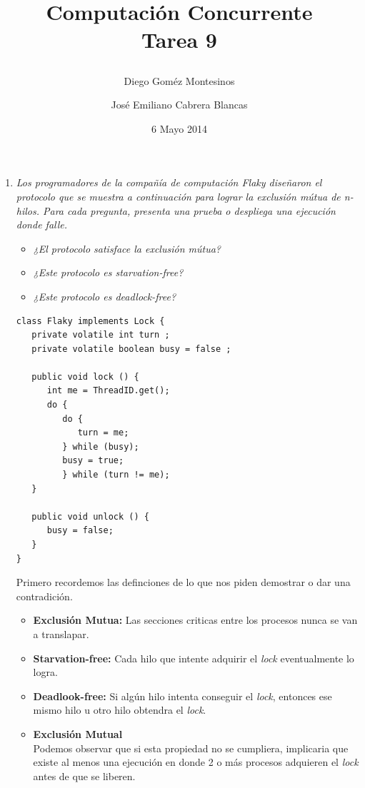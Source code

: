 \documentclass{article}
\title{ Computación Concurrente \\ \Large{Tarea 9}
\author{
  Diego Goméz Montesinos
  \and
  José Emiliano Cabrera Blancas
  }
\date{6 Mayo 2014}
}
\begin{document}
\maketitle
\begin{enumerate}
  
\item{
    \textsl{
      Los programadores de la compañía de computación Flaky diseñaron
      el protocolo que se muestra a continuación para lograr la
      exclusión mútua de n-hilos. Para cada pregunta, presenta una
      prueba o despliega una ejecución donde falle.
    }
      \begin{itemize}
        \item{\textsl{¿El protocolo satisface la exclusión mútua?}}
        \item{\textsl{¿Este protocolo es starvation-free?}}
        \item{\textsl{¿Este protocolo es deadlock-free?}}
      \end{itemize}

      \renewcommand{\lstlistingname}{}
\begin{lstlisting}[frame=single]
class Flaky implements Lock {
   private volatile int turn ;
   private volatile boolean busy = false ; 
   
   public void lock () {
      int me = ThreadID.get();
      do {
         do {
            turn = me;
         } while (busy);
         busy = true;
         } while (turn != me);
   }

   public void unlock () {
      busy = false;
   }
}
\end{lstlisting}
      
      Primero recordemos las definciones de lo que nos piden demostrar
      o dar una contradición.
      \begin{itemize}
      \item{\textbf{Exclusión Mutua:} Las secciones criticas entre
          los procesos nunca se van a translapar.}

        \item {\textbf{Starvation-free:} Cada hilo que intente
            adquirir el \textit{lock} eventualmente lo logra.}

        \item{\textbf{Deadlook-free:} Si algún hilo intenta conseguir
            el \textit{lock}, entonces ese mismo hilo u otro hilo
            obtendra el \textit{lock}.}
      \end{itemize}

      \begin{itemize}
        \item{\textbf{Exclusión Mutual}\\
            Podemos observar que si esta propiedad no se cumpliera,
            implicaria que existe al menos una ejecución en donde 2 o
            más procesos adquieren el \textit{lock} antes de que se
            liberen.\\

}
\end{itemize}}
\end{enumerate}
\end{document}

